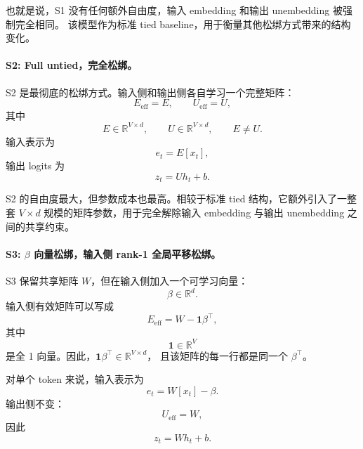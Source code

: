 也就是说，S1 没有任何额外自由度，输入 embedding 和输出 unembedding 被强制完全相同。
该模型作为标准 tied baseline，用于衡量其他松绑方式带来的结构变化。

\paragraph{S2: Full untied，完全松绑。}
S2 是最彻底的松绑方式。输入侧和输出侧各自学习一个完整矩阵：
\begin{equation}
    E_{\mathrm{eff}} = E, \qquad
    U_{\mathrm{eff}} = U,
\end{equation}
其中
\begin{equation}
    E \in \mathbb{R}^{V \times d}, \qquad
    U \in \mathbb{R}^{V \times d}, \qquad
    E \neq U.
\end{equation}
输入表示为
\begin{equation}
    e_t = E[x_t],
\end{equation}
输出 logits 为
\begin{equation}
    z_t = U h_t + b.
\end{equation}

S2 的自由度最大，但参数成本也最高。相较于标准 tied 结构，它额外引入了一整套
$V \times d$ 规模的矩阵参数，用于完全解除输入 embedding 与输出 unembedding 之间的共享约束。

\paragraph{S3: $\beta$ 向量松绑，输入侧 rank-1 全局平移松绑。}
S3 保留共享矩阵 $W$，但在输入侧加入一个可学习向量：
\begin{equation}
    \beta \in \mathbb{R}^{d}.
\end{equation}
输入侧有效矩阵可以写成
\begin{equation}
    E_{\mathrm{eff}} = W - \mathbf{1}\beta^\top,
\end{equation}
其中
\begin{equation}
    \mathbf{1} \in \mathbb{R}^{V}
\end{equation}
是全 1 向量。因此，$\mathbf{1}\beta^\top \in \mathbb{R}^{V \times d}$，
且该矩阵的每一行都是同一个 $\beta^\top$。

对单个 token 来说，输入表示为
\begin{equation}
    e_t = W[x_t] - \beta.
\end{equation}
输出侧不变：
\begin{equation}
    U_{\mathrm{eff}} = W,
\end{equation}
因此
\begin{equation}
    z_t = W h_t + b.
\end{equation}

